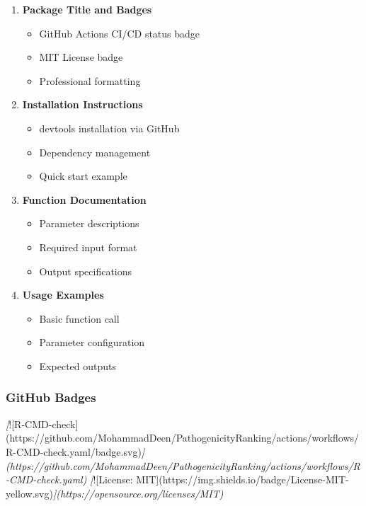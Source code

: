\documentclass[
  11pt,
]{article}
\newenvironment{Shaded}{\begin{snugshade}}{\end{snugshade}}
\newcommand{\AlertTok}[1]{\textcolor[rgb]{0.94,0.16,0.16}{#1}}
\newcommand{\CommentTok}[1]{\textcolor[rgb]{0.56,0.35,0.01}{\textit{#1}}}
\providecommand{\tightlist}{%
  \setlength{\itemsep}{0pt}\setlength{\parskip}{0pt}}
\begin{document}
\begin{enumerate}
\def\labelenumi{\arabic{enumi}.}
\tightlist
\item
  \textbf{Package Title and Badges}

  \begin{itemize}
  \tightlist
  \item
    GitHub Actions CI/CD status badge
  \item
    MIT License badge
  \item
    Professional formatting
  \end{itemize}
\item
  \textbf{Installation Instructions}

  \begin{itemize}
  \tightlist
  \item
    devtools installation via GitHub
  \item
    Dependency management
  \item
    Quick start example
  \end{itemize}
\item
  \textbf{Function Documentation}

  \begin{itemize}
  \tightlist
  \item
    Parameter descriptions
  \item
    Required input format
  \item
    Output specifications
  \end{itemize}
\item
  \textbf{Usage Examples}

  \begin{itemize}
  \tightlist
  \item
    Basic function call
  \item
    Parameter configuration
  \item
    Expected outputs
  \end{itemize}
\end{enumerate}

\subsubsection{GitHub Badges}\label{github-badges}

\begin{Shaded}
\begin{Highlighting}[]
\CommentTok{[}\AlertTok{![R{-}CMD{-}check](https://github.com/MohammadDeen/PathogenicityRanking/actions/workflows/R{-}CMD{-}check.yaml/badge.svg)}\CommentTok{](https://github.com/MohammadDeen/PathogenicityRanking/actions/workflows/R{-}CMD{-}check.yaml)}
\CommentTok{[}\AlertTok{![License: MIT](https://img.shields.io/badge/License{-}MIT{-}yellow.svg)}\CommentTok{](https://opensource.org/licenses/MIT)}
\end{Highlighting}
\end{Shaded}
\end{document}
